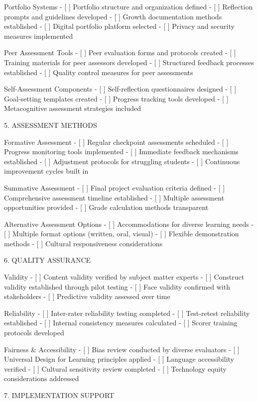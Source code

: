 \begin{appendices}
    Portfolio Systems
- [ ] Portfolio structure and organization defined
- [ ] Reflection prompts and guidelines developed
- [ ] Growth documentation methods established
- [ ] Digital portfolio platform selected
- [ ] Privacy and security measures implemented

    Peer Assessment Tools
- [ ] Peer evaluation forms and protocols created
- [ ] Training materials for peer assessors developed
- [ ] Structured feedback processes established
- [ ] Quality control measures for peer assessments

    Self-Assessment Components
- [ ] Self-reflection questionnaires designed
- [ ] Goal-setting templates created
- [ ] Progress tracking tools developed
- [ ] Metacognitive assessment strategies included

   5. ASSESSMENT METHODS

    Formative Assessment
- [ ] Regular checkpoint assessments scheduled
- [ ] Progress monitoring tools implemented
- [ ] Immediate feedback mechanisms established
- [ ] Adjustment protocols for struggling students
- [ ] Continuous improvement cycles built in

    Summative Assessment
- [ ] Final project evaluation criteria defined
- [ ] Comprehensive assessment timeline established
- [ ] Multiple assessment opportunities provided
- [ ] Grade calculation methods transparent

    Alternative Assessment Options
- [ ] Accommodations for diverse learning needs
- [ ] Multiple format options (written, oral, visual)
- [ ] Flexible demonstration methods
- [ ] Cultural responsiveness considerations

   6. QUALITY ASSURANCE

    Validity
- [ ] Content validity verified by subject matter experts
- [ ] Construct validity established through pilot testing
- [ ] Face validity confirmed with stakeholders
- [ ] Predictive validity assessed over time

    Reliability
- [ ] Inter-rater reliability testing completed
- [ ] Test-retest reliability established
- [ ] Internal consistency measures calculated
- [ ] Scorer training protocols developed

    Fairness & Accessibility
- [ ] Bias review conducted by diverse evaluators
- [ ] Universal Design for Learning principles applied
- [ ] Language accessibility verified
- [ ] Cultural sensitivity review completed
- [ ] Technology equity considerations addressed

   7. IMPLEMENTATION SUPPORT


\end{appendices}
